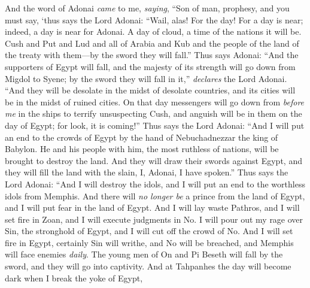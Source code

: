 \begin{biblechapter} %
 And the word of Adonai \textit{came} to me, \textit{saying},
\verse “Son of man, prophesy, and you must say, ‘thus says the Lord Adonai:
\verse “Wail, alas! For the day!
\verse For a day is near; 
indeed, a day is near for Adonai. 
A day of cloud, 
a time of the nations it will be.
\verse Cush and Put and Lud and all of Arabia and Kub and the people of the land of the treaty with them—by the sword they will fall.”
\verse Thus says Adonai:
\verse “And the supporters of Egypt will fall, 
and the majesty of its strength will go down 
from Migdol to Syene; 
by the sword they will fall in it,” 
\textit{declares} the Lord Adonai.
\verse “And they will be desolate in the midst of desolate countries, 
and its cities will be in the midst of ruined cities.
\verse On that day messengers will go down from \textit{before me} in the ships to terrify unsuspecting Cush, and anguish will be in them on the day of Egypt; for look, it is coming!”
\verse Thus says the Lord Adonai:
\verse “And I will put an end to the crowds of Egypt 
by the hand of Nebuchadnezzar the king of Babylon.
\verse He and his people with him, the most ruthless of nations, 
will be brought to destroy the land. 
And they will draw their swords against Egypt, 
and they will fill the land with the slain, I, Adonai, I have spoken.”
\verse Thus says the Lord Adonai:
\verse “And I will destroy the idols, 
and I will put an end to the worthless idols from Memphis. 
And there will \textit{no longer be} a prince from the land of Egypt, 
and I will put fear in the land of Egypt.
\verse And I will lay waste Pathros, 
and I will set fire in Zoan, 
and I will execute judgments in No.
\verse I will pour out my rage over Sin, 
the stronghold of Egypt, 
and I will cut off the crowd of No.
\verse And I will set fire in Egypt, 
certainly Sin will writhe, 
and No will be breached, 
and Memphis will face enemies \textit{daily}.
\verse The young men of On and Pi Beseth will fall by the sword, 
and they will go into captivity.
\verse And at Tahpanhes the day will become dark 
when I break the yoke of Egypt, 

\end{biblechapter}
